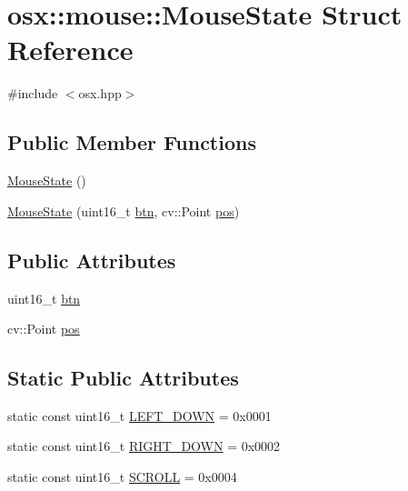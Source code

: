 \hypertarget{structosx_1_1mouse_1_1_mouse_state}{\section{osx\-:\-:mouse\-:\-:Mouse\-State Struct Reference}
\label{structosx_1_1mouse_1_1_mouse_state}
}


{\ttfamily \#include $<$osx.\-hpp$>$}

\subsection*{Public Member Functions}
\begin{DoxyCompactItemize}
\item 
\hyperlink{structosx_1_1mouse_1_1_mouse_state_a0df57029fed62314b2cde044a301e560}{Mouse\-State} ()
\item 
\hyperlink{structosx_1_1mouse_1_1_mouse_state_a0026830ab2d01f9a5cbcf0decf7940a7}{Mouse\-State} (uint16\-\_\-t \hyperlink{structosx_1_1mouse_1_1_mouse_state_a2463a45ed53f3952c6d9a544a5dd680b}{btn}, cv\-::\-Point \hyperlink{structosx_1_1mouse_1_1_mouse_state_ae5404fd7615addf7c40e15ebb4af7f97}{pos})
\end{DoxyCompactItemize}
\subsection*{Public Attributes}
\begin{DoxyCompactItemize}
\item 
uint16\-\_\-t \hyperlink{structosx_1_1mouse_1_1_mouse_state_a2463a45ed53f3952c6d9a544a5dd680b}{btn}
\item 
cv\-::\-Point \hyperlink{structosx_1_1mouse_1_1_mouse_state_ae5404fd7615addf7c40e15ebb4af7f97}{pos}
\end{DoxyCompactItemize}
\subsection*{Static Public Attributes}
\begin{DoxyCompactItemize}
\item 
static const uint16\-\_\-t \hyperlink{structosx_1_1mouse_1_1_mouse_state_a9490a7acba9726f815fa3246985da50b}{L\-E\-F\-T\-\_\-\-D\-O\-W\-N} = 0x0001
\item 
static const uint16\-\_\-t \hyperlink{structosx_1_1mouse_1_1_mouse_state_a23bf52536a66f3ca8f3d1cebb0f401ee}{R\-I\-G\-H\-T\-\_\-\-D\-O\-W\-N} = 0x0002
\item 
static const uint16\-\_\-t \hyperlink{structosx_1_1mouse_1_1_mouse_state_a09e8666395882198d1bca0a745f216df}{S\-C\-R\-O\-L\-L} = 0x0004
\end{DoxyCompactItemize}



